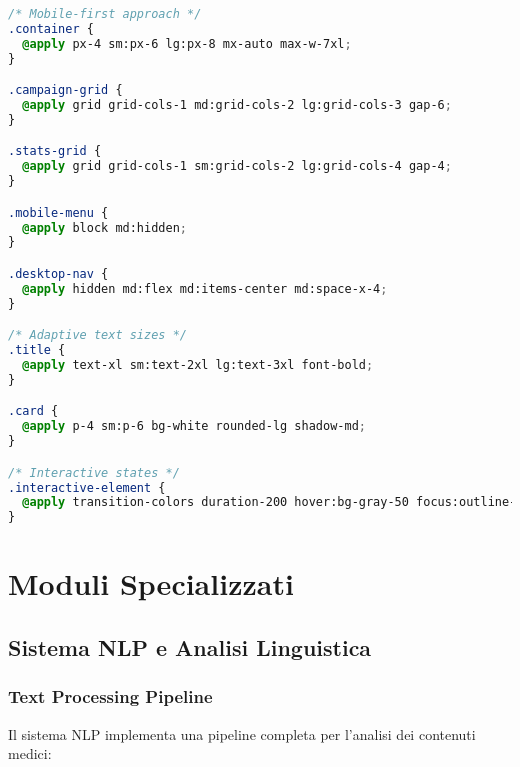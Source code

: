 \documentclass[12pt,a4paper]{report}
\begin{document}
\begin{lstlisting}[language=CSS, caption=Responsive Design Classes (Tailwind)]
/* Mobile-first approach */
.container {
  @apply px-4 sm:px-6 lg:px-8 mx-auto max-w-7xl;
}

.campaign-grid {
  @apply grid grid-cols-1 md:grid-cols-2 lg:grid-cols-3 gap-6;
}

.stats-grid {
  @apply grid grid-cols-1 sm:grid-cols-2 lg:grid-cols-4 gap-4;
}

.mobile-menu {
  @apply block md:hidden;
}

.desktop-nav {
  @apply hidden md:flex md:items-center md:space-x-4;
}

/* Adaptive text sizes */
.title {
  @apply text-xl sm:text-2xl lg:text-3xl font-bold;
}

.card {
  @apply p-4 sm:p-6 bg-white rounded-lg shadow-md;
}

/* Interactive states */
.interactive-element {
  @apply transition-colors duration-200 hover:bg-gray-50 focus:outline-none focus:ring-2 focus:ring-blue-500;
}
\end{lstlisting}

\chapter{Moduli Specializzati}

\section{Sistema NLP e Analisi Linguistica}

\subsection{Text Processing Pipeline}

Il sistema NLP implementa una pipeline completa per l'analisi dei contenuti medici:
\end{document}
